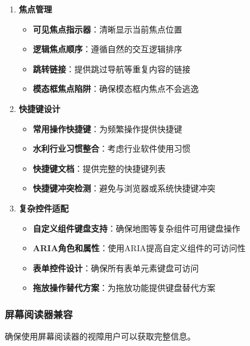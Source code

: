 \begin{enumerate}
\def\labelenumi{\arabic{enumi}.}
\tightlist
\item
  \textbf{焦点管理}

  \begin{itemize}
  \tightlist
  \item
    \textbf{可见焦点指示器}：清晰显示当前焦点位置
  \item
    \textbf{逻辑焦点顺序}：遵循自然的交互逻辑排序
  \item
    \textbf{跳转链接}：提供跳过导航等重复内容的链接
  \item
    \textbf{模态框焦点陷阱}：确保模态框内焦点不会逃逸
  \end{itemize}
\item
  \textbf{快捷键设计}

  \begin{itemize}
  \tightlist
  \item
    \textbf{常用操作快捷键}：为频繁操作提供快捷键
  \item
    \textbf{水利行业习惯整合}：考虑行业软件使用习惯
  \item
    \textbf{快捷键文档}：提供完整的快捷键列表
  \item
    \textbf{快捷键冲突检测}：避免与浏览器或系统快捷键冲突
  \end{itemize}
\item
  \textbf{复杂控件适配}

  \begin{itemize}
  \tightlist
  \item
    \textbf{自定义组件键盘支持}：确保地图等复杂组件可用键盘操作
  \item
    \textbf{ARIA角色和属性}：使用ARIA提高自定义组件的可访问性
  \item
    \textbf{表单控件设计}：确保所有表单元素键盘可访问
  \item
    \textbf{拖放操作替代方案}：为拖放功能提供键盘替代方案
  \end{itemize}
\end{enumerate}

\subsubsection{屏幕阅读器兼容}\label{ux5c4fux5e55ux9605ux8bfbux5668ux517cux5bb9}

确保使用屏幕阅读器的视障用户可以获取完整信息。

